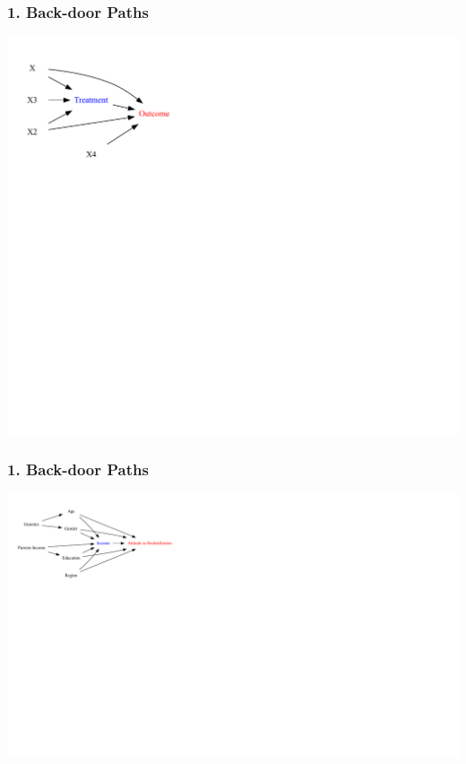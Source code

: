 \documentclass[xcolor=x11names,compress]{beamer}\usepackage[]{graphicx}\usepackage[]{color}
\newenvironment{knitrout}{}{} %
\renewcommand{\(}{\begin{columns}}
\renewcommand{\)}{\end{columns}}
\newcommand{\<}[1]{\begin{column}{#1}}
\renewcommand{\>}{\end{column}}
\begin{document}
\begin{frame}
\frametitle{1. Back-door Paths}
\begin{knitrout}
\color{fgcolor}
\includegraphics[width=2.5\linewidth]{figure/Dag2c-1} 

\end{knitrout}
\end{frame}

\begin{frame}
\frametitle{1. Back-door Paths}
\begin{knitrout}
\color{fgcolor}
\includegraphics[width=2.7\linewidth]{figure/Dag4_paths_b-1} 

\end{knitrout}
\end{frame}
\end{document}
